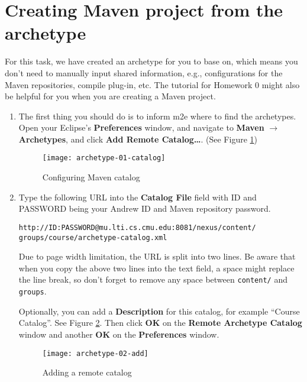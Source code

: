 
\section{Creating Maven project from the archetype}

For this task, we have created an archetype for you to base on, which means you
don't need to manually input shared information, e.g., configurations for the
Maven repositories, compile plug-in, etc. The tutorial for Homework 0 might also
be helpful for you when you are creating a Maven project.

\begin{enumerate}

\item The first thing you should do is to inform m2e where to find the
archetypes. Open your Eclipse's \textbf{Preferences} window, and navigate to
\textbf{Maven} $\rightarrow$ \textbf{Archetypes}, and click \textbf{Add Remote
Catalog\ldots}. (See Figure \ref{fig:archetype-01-catalog})

\begin{figure}[t]
\centering
\texttt{[image: archetype-01-catalog]}
\caption{Configuring Maven catalog\label{fig:archetype-01-catalog}}
\end{figure}

\item Type the following URL into the \textbf{Catalog File} field with ID and
PASSWORD being your Andrew ID and Maven repository password.

\begin{verbatim}
http://ID:PASSWORD@mu.lti.cs.cmu.edu:8081/nexus/content/
groups/course/archetype-catalog.xml 
\end{verbatim}

Due to page width limitation, the URL is split into two lines. Be aware that
when you copy the above two lines into the text field, a space might replace the
line break, so don't forget to remove any space between \verb|content/| and
\verb|groups|.

Optionally, you can add a \textbf{Description} for this catalog, for example
``Course Catalog''. See Figure \ref{fig:archetype-02-add}. Then click
\textbf{OK} on the \textbf{Remote Archetype Catalog} window and another
\textbf{OK} on the \textbf{Preferences} window.

\begin{figure}[t]
\centering
\texttt{[image: archetype-02-add]}
\caption{Adding a remote catalog\label{fig:archetype-02-add}}
\end{figure}


\end{enumerate}

